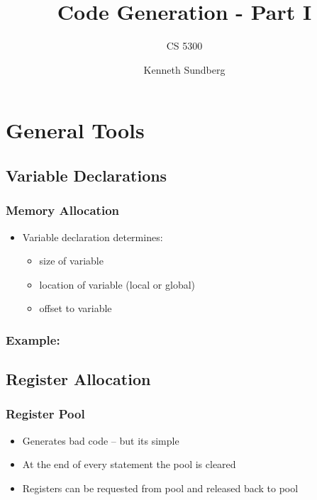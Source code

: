 \documentclass[usepdftitle=false,professionalfonts,compress ]{beamer}
\title{Code Generation - Part I}
\subtitle{CS 5300}
\author{Kenneth Sundberg}
\date{}
\begin{document}
\frame[plain]{
	\frametitle{}
	\titlepage
	\vspace{-0.5cm}
	\begin{center}
	\end{center}
}
\frame{
	\tableofcontents[hideallsubsections]
}
















\section{General Tools}
		
\subsection{Variable Declarations}

{
\begin{frame}\frametitle{Memory Allocation}

	\begin{itemize}
	\item Variable declaration determines:

	\begin{itemize}
	\item size of variable
			\item location of variable (local or global)
			\item offset to variable
				\end{itemize}

				\end{itemize}

\end{frame}}



{
\begin{frame}\frametitle{Example:}

\end{frame}}

\subsection{Register Allocation}

{
\begin{frame}\frametitle{Register Pool}

	\begin{itemize}
	\item Generates bad code -- but its simple
			\item At the end of every statement the pool is cleared
			\item Registers can be requested from pool and released back to pool
				\end{itemize}

\end{frame}}
\end{document}
